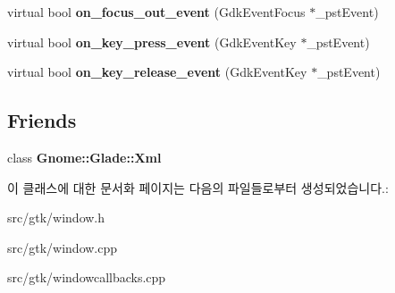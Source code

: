 \begin{DoxyCompactItemize}
\item 
\mbox{\label{class_v_b_a_1_1_window_a1153e9927db5e913c4364d507adbfc4b}} 
virtual bool {\bfseries on\+\_\+focus\+\_\+out\+\_\+event} (Gdk\+Event\+Focus $\ast$\+\_\+pst\+Event)
\item 
\mbox{\label{class_v_b_a_1_1_window_a3fc2f454d5b9bbb8a74d44c3ac10655d}} 
virtual bool {\bfseries on\+\_\+key\+\_\+press\+\_\+event} (Gdk\+Event\+Key $\ast$\+\_\+pst\+Event)
\item 
\mbox{\label{class_v_b_a_1_1_window_af7c7628164d393dd278503b1d95298fa}} 
virtual bool {\bfseries on\+\_\+key\+\_\+release\+\_\+event} (Gdk\+Event\+Key $\ast$\+\_\+pst\+Event)
\end{DoxyCompactItemize}
\subsection*{Friends}
\begin{DoxyCompactItemize}
\item 
\mbox{\label{class_v_b_a_1_1_window_af61c9d83735058c67bfeb2f2bbc43c47}} 
class {\bfseries Gnome\+::\+Glade\+::\+Xml}
\end{DoxyCompactItemize}


이 클래스에 대한 문서화 페이지는 다음의 파일들로부터 생성되었습니다.\+:\begin{DoxyCompactItemize}
\item 
src/gtk/window.\+h\item 
src/gtk/window.\+cpp\item 
src/gtk/windowcallbacks.\+cpp\end{DoxyCompactItemize}
